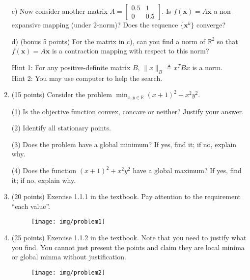 \documentclass[11pt,letterpaper]{article}
\begin{document}
\begin{enumerate}
c) Now consider another matrix $A = \begin{bmatrix}
0.5 & 1  \\ 
 0    & 0.5
\end{bmatrix}$. 
Is $f(\mathbf{x} ) = A \mathbf{x}$  a non-expansive mapping (under 2-norm)? Does the sequence $\{ \mathbf{x}^k \}$ converge?


d) (bonus 5 points) For the matrix in c), can you find a norm of $\mathbb{R}^2$ so that $f(\mathbf{x} ) = A \mathbf{x}$ is a contraction mapping with respect to this norm?

Hint 1: For any positive-definite matrix $B$, $\| x\|_B \triangleq x^T B x $
is a norm.   \\
Hint 2: You may use computer to help the search.


\item (15 points)
Consider the problem $ \min_{ x,y \in \mathbb{R} } (x+1)^2+x^2 y^2.$  

(1) Is the objective function convex, concave or neither? Justify your answer. 

(2) Identify all stationary points.

(3) Does the problem have a global minimum? If yes, find it; if no, explain why.

(4) Does the function $(x+1)^2+x^2 y^2$  have a global maximum? If yes, find it; if no, explain why.



\vspace{0.8cm}	
	
 \item  (20 points) Exercise 1.1.1 in the textbook. Pay attention to the requirement ``each value''. 
	\begin{figure}[h]  \vspace{-0.4cm}
	\texttt{[image: img/problem1]}
\end{figure}

\item (25 points) Exercise 1.1.2 in the textbook. Note that you need to justify what you find. You cannot just present
the points and claim they are local minima or global minma without justification. 

\begin{figure}[h]  \vspace{-0.4cm}
	\texttt{[image: img/problem2]}
\end{figure}




\end{enumerate}
\end{document}
